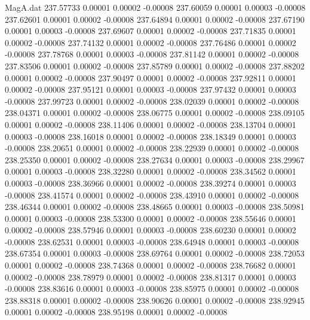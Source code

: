 \begin{filecontents}{MagA.dat}
 237.57733    0.00001    0.00002   -0.00008
 237.60059    0.00001    0.00003   -0.00008
 237.62601    0.00001    0.00002   -0.00008
 237.64894    0.00001    0.00002   -0.00008
 237.67190    0.00001    0.00003   -0.00008
 237.69607    0.00001    0.00002   -0.00008
 237.71835    0.00001    0.00002   -0.00008
 237.74132    0.00001    0.00002   -0.00008
 237.76486    0.00001    0.00002   -0.00008
 237.78768    0.00001    0.00003   -0.00008
 237.81142    0.00001    0.00002   -0.00008
 237.83506    0.00001    0.00002   -0.00008
 237.85789    0.00001    0.00002   -0.00008
 237.88202    0.00001    0.00002   -0.00008
 237.90497    0.00001    0.00002   -0.00008
 237.92811    0.00001    0.00002   -0.00008
 237.95121    0.00001    0.00003   -0.00008
 237.97432    0.00001    0.00003   -0.00008
 237.99723    0.00001    0.00002   -0.00008
 238.02039    0.00001    0.00002   -0.00008
 238.04371    0.00001    0.00002   -0.00008
 238.06775    0.00001    0.00002   -0.00008
 238.09105    0.00001    0.00002   -0.00008
 238.11406    0.00001    0.00002   -0.00008
 238.13704    0.00001    0.00003   -0.00008
 238.16018    0.00001    0.00002   -0.00008
 238.18349    0.00001    0.00003   -0.00008
 238.20651    0.00001    0.00002   -0.00008
 238.22939    0.00001    0.00002   -0.00008
 238.25350    0.00001    0.00002   -0.00008
 238.27634    0.00001    0.00003   -0.00008
 238.29967    0.00001    0.00003   -0.00008
 238.32280    0.00001    0.00002   -0.00008
 238.34562    0.00001    0.00003   -0.00008
 238.36966    0.00001    0.00002   -0.00008
 238.39274    0.00001    0.00003   -0.00008
 238.41574    0.00001    0.00002   -0.00008
 238.43910    0.00001    0.00002   -0.00008
 238.46344    0.00001    0.00002   -0.00008
 238.48665    0.00001    0.00003   -0.00008
 238.50981    0.00001    0.00003   -0.00008
 238.53300    0.00001    0.00002   -0.00008
 238.55646    0.00001    0.00002   -0.00008
 238.57946    0.00001    0.00003   -0.00008
 238.60230    0.00001    0.00002   -0.00008
 238.62531    0.00001    0.00003   -0.00008
 238.64948    0.00001    0.00003   -0.00008
 238.67354    0.00001    0.00003   -0.00008
 238.69764    0.00001    0.00002   -0.00008
 238.72053    0.00001    0.00002   -0.00008
 238.74368    0.00001    0.00002   -0.00008
 238.76682    0.00001    0.00002   -0.00008
 238.78979    0.00001    0.00002   -0.00008
 238.81317    0.00001    0.00003   -0.00008
 238.83616    0.00001    0.00003   -0.00008
 238.85975    0.00001    0.00002   -0.00008
 238.88318    0.00001    0.00002   -0.00008
 238.90626    0.00001    0.00002   -0.00008
 238.92945    0.00001    0.00002   -0.00008
 238.95198    0.00001    0.00002   -0.00008

\end{filecontents}
